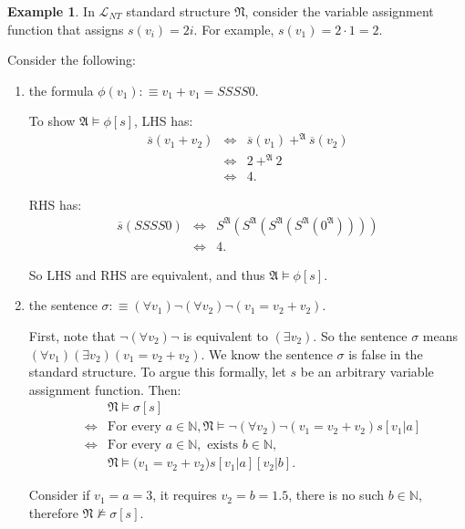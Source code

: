 \documentclass[11pt,letterpaper]{book}
\theoremstyle{definition}
\newtheorem{example}{Example}[section]
\begin{document}
\begin{example}
In $\mathcal{L}_{NT}$ standard structure $ \mathfrak{N}$, consider the
variable assignment function that assigns $s(v_i) = 2i$. For example,
$s(v_1) = 2 \cdot 1 = 2$.

Consider the following:
\begin{enumerate}
\item{the formula $\phi (v_1):\equiv v_1 + v_1 = S S S S 0 $.}

To show $\mathfrak{A} \models \phi[s]$, LHS has:
\begin{eqnarray*}
\overline{s} (v_1 + v_2) & \iff & \overline{s} (v_1)\ +^{\mathfrak{A}} \
\overline{s} (v_2) \\
& \iff & 2  \ +^{\mathfrak{A}} \ 2 \\
& \iff & 4.
\end{eqnarray*}

RHS has:
\begin{eqnarray*}
\overline{s} (S S S S0) & \iff & S^{\mathfrak{A}} ( S^{\mathfrak{A}} (
S^{\mathfrak{A}} ( S^{\mathfrak{A}} ( 0^{\mathfrak{A}} ) ) ) ) \\
& \iff & 4.
\end{eqnarray*}

So LHS and RHS are equivalent, and thus $\mathfrak{A} \models \phi[s]$.

\item{the sentence $\sigma :\equiv (\forall v_1) \lnot (\forall v_2)
\lnot (v_1 = v_2 + v_2) $.}

First, note that $\lnot (\forall v_2) \lnot $ is equivalent to $(\exists
v_2) $. So the sentence $\sigma$ means $ (\forall v_1) (\exists v_2)
(v_1 = v_2 + v_2) $. We know the sentence $\sigma$ is false in the
standard structure. To argue this formally, let $s$ be an arbitrary
variable assignment function. Then:
\begin{eqnarray*}
& & \mathfrak{N} \models \sigma[s] \\
& \iff & \mbox{For every } a \in \mathbb{N}, \mathfrak{N}
\models \lnot (\forall v_2) \lnot (v_1 = v_2 + v_2) s[v_1 | a] \\
& \iff & \mbox{For every } a \in \mathbb{N}, \mbox{ exists } b
\in \mathbb{N}, \\
& & \mathfrak{N} \models \big( v_1 = v_2 + v_2 \big) s[v_1
| a][v_2 | b].
\end{eqnarray*}

Consider if $v_1 = a = 3$, it requires $v_2 = b=1.5$, there is no such 
$b \in \mathbb{N}$, therefore $ \mathfrak{N}
\not \models \sigma[s]$.

\end{enumerate}

\end{example}
\end{document}
